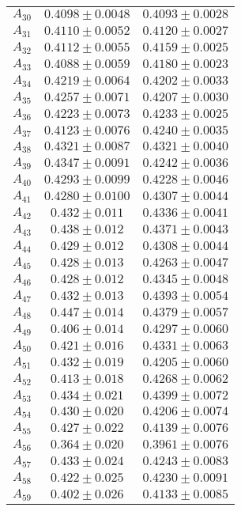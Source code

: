 \begin{tabular}{c|c|c}
$A_30$ & $0.4098\pm0.0048$ & $0.4093\pm0.0028$ \\
$A_31$ & $0.4110\pm0.0052$ & $0.4120\pm0.0027$ \\
$A_32$ & $0.4112\pm0.0055$ & $0.4159\pm0.0025$ \\
$A_33$ & $0.4088\pm0.0059$ & $0.4180\pm0.0023$ \\
$A_34$ & $0.4219\pm0.0064$ & $0.4202\pm0.0033$ \\
$A_35$ & $0.4257\pm0.0071$ & $0.4207\pm0.0030$ \\
$A_36$ & $0.4223\pm0.0073$ & $0.4233\pm0.0025$ \\
$A_37$ & $0.4123\pm0.0076$ & $0.4240\pm0.0035$ \\
$A_38$ & $0.4321\pm0.0087$ & $0.4321\pm0.0040$ \\
$A_39$ & $0.4347\pm0.0091$ & $0.4242\pm0.0036$ \\
$A_40$ & $0.4293\pm0.0099$ & $0.4228\pm0.0046$ \\
$A_41$ & $0.4280\pm0.0100$ & $0.4307\pm0.0044$ \\
$A_42$ & $0.432\pm0.011$ & $0.4336\pm0.0041$ \\
$A_43$ & $0.438\pm0.012$ & $0.4371\pm0.0043$ \\
$A_44$ & $0.429\pm0.012$ & $0.4308\pm0.0044$ \\
$A_45$ & $0.428\pm0.013$ & $0.4263\pm0.0047$ \\
$A_46$ & $0.428\pm0.012$ & $0.4345\pm0.0048$ \\
$A_47$ & $0.432\pm0.013$ & $0.4393\pm0.0054$ \\
$A_48$ & $0.447\pm0.014$ & $0.4379\pm0.0057$ \\
$A_49$ & $0.406\pm0.014$ & $0.4297\pm0.0060$ \\
$A_50$ & $0.421\pm0.016$ & $0.4331\pm0.0063$ \\
$A_51$ & $0.432\pm0.019$ & $0.4205\pm0.0060$ \\
$A_52$ & $0.413\pm0.018$ & $0.4268\pm0.0062$ \\
$A_53$ & $0.434\pm0.021$ & $0.4399\pm0.0072$ \\
$A_54$ & $0.430\pm0.020$ & $0.4206\pm0.0074$ \\
$A_55$ & $0.427\pm0.022$ & $0.4139\pm0.0076$ \\
$A_56$ & $0.364\pm0.020$ & $0.3961\pm0.0076$ \\
$A_57$ & $0.433\pm0.024$ & $0.4243\pm0.0083$ \\
$A_58$ & $0.422\pm0.025$ & $0.4230\pm0.0091$ \\
$A_59$ & $0.402\pm0.026$ & $0.4133\pm0.0085$ \\

\end{tabular}
